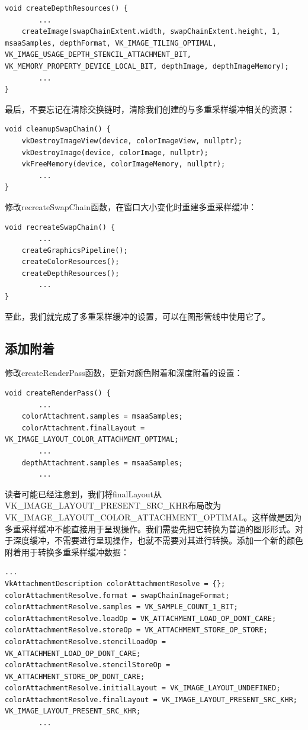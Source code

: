 \documentclass{ctexart}
\begin{document}
\begin{lstlisting}[language={[ANSI]C}]
void createDepthResources() {
		...
	createImage(swapChainExtent.width, swapChainExtent.height, 1, msaaSamples, depthFormat, VK_IMAGE_TILING_OPTIMAL, VK_IMAGE_USAGE_DEPTH_STENCIL_ATTACHMENT_BIT, VK_MEMORY_PROPERTY_DEVICE_LOCAL_BIT, depthImage, depthImageMemory);
		...
}
\end{lstlisting}

最后，不要忘记在清除交换链时，清除我们创建的与多重采样缓冲相关的资源：

\begin{lstlisting}[language={[ANSI]C}]
void cleanupSwapChain() {
	vkDestroyImageView(device, colorImageView, nullptr);
	vkDestroyImage(device, colorImage, nullptr);
	vkFreeMemory(device, colorImageMemory, nullptr);
		...
}
\end{lstlisting}

修改recreateSwapChain函数，在窗口大小变化时重建多重采样缓冲：

\begin{lstlisting}[language={[ANSI]C}]
void recreateSwapChain() {
		...
	createGraphicsPipeline();
	createColorResources();
	createDepthResources();
		...
}
\end{lstlisting}

至此，我们就完成了多重采样缓冲的设置，可以在图形管线中使用它了。

\subsection{添加附着}

修改createRenderPass函数，更新对颜色附着和深度附着的设置：

\begin{lstlisting}[language={[ANSI]C}]
void createRenderPass() {
		...
	colorAttachment.samples = msaaSamples;
	colorAttachment.finalLayout = VK_IMAGE_LAYOUT_COLOR_ATTACHMENT_OPTIMAL;
		...
	depthAttachment.samples = msaaSamples;
		...
\end{lstlisting}

读者可能已经注意到，我们将finalLayout从VK\_IMAGE\_LAYOUT\_PRESENT\_SRC\_KHR布局改为VK\_IMAGE\_LAYOUT\_COLOR\_ATTACHMENT\_OPTIMAL。这样做是因为多重采样缓冲不能直接用于呈现操作。我们需要先把它转换为普通的图形形式。对于深度缓冲，不需要进行呈现操作，也就不需要对其进行转换。添加一个新的颜色附着用于转换多重采样缓冲数据：

\begin{lstlisting}[language={[ANSI]C}]
		...
VkAttachmentDescription colorAttachmentResolve = {};
colorAttachmentResolve.format = swapChainImageFormat;
colorAttachmentResolve.samples = VK_SAMPLE_COUNT_1_BIT;
colorAttachmentResolve.loadOp = VK_ATTACHMENT_LOAD_OP_DONT_CARE;
colorAttachmentResolve.storeOp = VK_ATTACHMENT_STORE_OP_STORE;
colorAttachmentResolve.stencilLoadOp = VK_ATTACHMENT_LOAD_OP_DONT_CARE;
colorAttachmentResolve.stencilStoreOp = VK_ATTACHMENT_STORE_OP_DONT_CARE;
colorAttachmentResolve.initialLayout = VK_IMAGE_LAYOUT_UNDEFINED;
colorAttachmentResolve.finalLayout = VK_IMAGE_LAYOUT_PRESENT_SRC_KHR;
VK_IMAGE_LAYOUT_PRESENT_SRC_KHR;
		...
\end{lstlisting}
\end{document}
